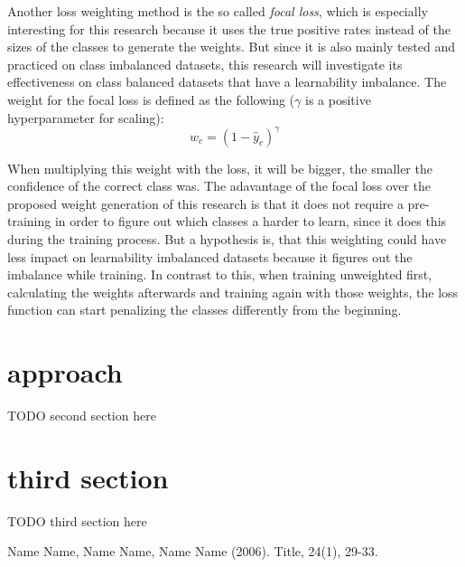\documentclass[journal]{IEEEtran}
\begin{document}
Another loss weighting method is the so called \emph{focal loss}, which is especially interesting for this research because it uses the true positive rates instead of the sizes of the classes to generate the weights.
But since it is also mainly tested and practiced on class imbalanced datasets, this research will investigate its effectiveness on class balanced datasets that have a learnability imbalance.
The weight for the focal loss is defined as the following ($\gamma$ is a positive hyperparameter for scaling):
\[ w_c = (1 - \hat{y}_c)^\gamma \]

When multiplying this weight with the loss, it will be bigger, the smaller the confidence of the correct class was. 
The adavantage of the focal loss over the proposed weight generation of this research is that it does not require a pre-training in order to figure out which classes a harder to learn, since it does this during the training process.
But a hypothesis is, that this weighting could have less impact on learnability imbalanced datasets because it figures out the imbalance while training.
In contrast to this, when training unweighted first, calculating the weights afterwards and training again with those weights, the loss function can start penalizing the classes differently from the beginning.




\section{approach}
TODO second section here

\section{third section}
TODO third section here

\begin{thebibliography}{1}

\bibitem{}
Name Name, Name Name, Name Name (2006). Title, 24(1), 29-33.

\end{thebibliography}
\end{document}
